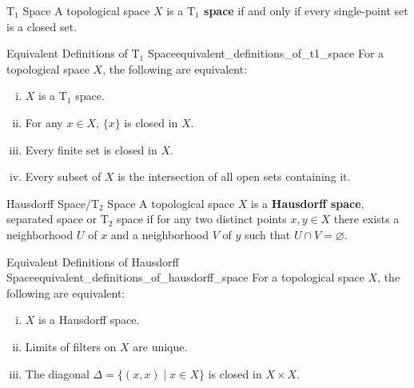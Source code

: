 \documentclass{report}
\begin{document}
\begin{definition}{$\mathrm{T}_1$ Space}{}
	A topological space $X$ is a \textbf{$\mathrm{T}_1$ space} if and only if every single-point set is a closed set.
\end{definition}

\begin{proposition}{Equivalent Definitions of $\mathrm{T}_1$ Space}{equivalent_definitions_of_t1_space}
	For a topological space $X$, the following are equivalent:
	\begin{enumerate}[(i)]
		\item $X$ is a $\mathrm{T}_1$ space.
		\item For any $x\in X$, $\{x\}$ is closed in $X$.
		\item Every finite set is closed in $X$.
		\item Every subset of $X$ is the intersection of all open sets containing it.
	\end{enumerate}
	
\end{proposition}


\begin{definition}{Hausdorff Space/$\mathrm{T}_2$ Space}{}
	A topological space $X$ is a \textbf{Hausdorff space}, separated space or $\mathrm{T}_2$ space if for any two distinct points $x,y\in X$ there exists a neighborhood $U$ of $x$ and a neighborhood $V$ of $y$ such that $U\cap V=\varnothing$.
\end{definition}

\begin{proposition}{Equivalent Definitions of Hausdorff Space}{equivalent_definitions_of_hausdorff_space}
	For a topological space $X$, the following are equivalent:
	\begin{enumerate}[(i)]
		\item $X$ is a Hausdorff space.
		\item Limits of filters on $X$ are unique.
		\item The diagonal $\Delta=\{(x,x)\mid x\in X\}$ is closed in $X\times X$.
	\end{enumerate}
\end{proposition}
\end{document}

